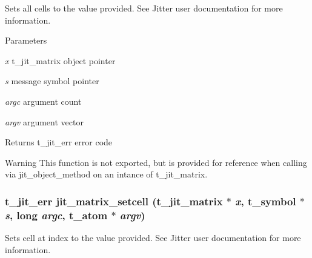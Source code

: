 Sets all cells to the value provided. See Jitter user documentation for more information.


\begin{DoxyParams}{Parameters}
\item[{\em x}]t\_\-jit\_\-matrix object pointer \item[{\em s}]message symbol pointer \item[{\em argc}]argument count \item[{\em argv}]argument vector\end{DoxyParams}
\begin{DoxyReturn}{Returns}
t\_\-jit\_\-err error code
\end{DoxyReturn}
\begin{DoxyWarning}{Warning}
This function is not exported, but is provided for reference when calling via jit\_\-object\_\-method on an intance of t\_\-jit\_\-matrix. 
\end{DoxyWarning}
\hypertarget{group__matrixmod_gafe9683aa769a6c97e9645f889765da62}{
\subsubsection[{jit\_\-matrix\_\-setcell}]{\setlength{\rightskip}{0pt plus 5cm}t\_\-jit\_\-err jit\_\-matrix\_\-setcell (t\_\-jit\_\-matrix $\ast$ {\em x}, \/  {\bf t\_\-symbol} $\ast$ {\em s}, \/  long {\em argc}, \/  {\bf t\_\-atom} $\ast$ {\em argv})}}
\label{group__matrixmod_gafe9683aa769a6c97e9645f889765da62}


Sets cell at index to the value provided. See Jitter user documentation for more information.


